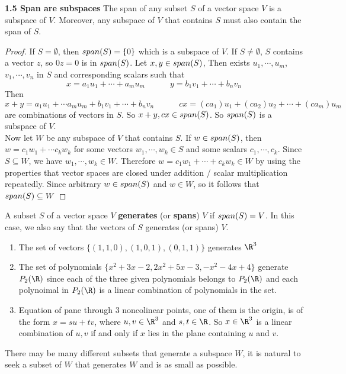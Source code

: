 \documentclass[11pt]{article}
\begin{document}
\begin{theorem*}
    \textbf{1.5 Span are subspaces} The span of any subset $S$ of a vector space $V$ is a subspace of $V$. Moreover, any subspace of $V$ that contains $S$ must also contain the span of $S$. 
    \begin{proof}
        If $S=\emptyset$, then $span(S) = \{ 0\}$ which is a subspace of $V$. If $S\neq \emptyset$, $S$ contains a vector $z$, so $0z = 0$ is in $span(S)$. Let $x,y\in span(S)$, Then exists $u_1,\cdots, u_m$, $v_1,\cdots, v_n$ in $S$ and corresponding scalars such that 
        \[
            x = a_1 u_1 + \cdots + a_m u_m 
            \quad \quad \quad 
            y = b_1 v_1 + \cdots + b_n v_n
        \]
        Then 
        \[
            x+y=a_1 u_1 + \cdots a_m u_m + b_1 v_1 + \cdots + b_n v_n 
            \quad \quad \quad 
            cx = (ca_1)u_1 + (ca_2)u_2 + \cdots + (ca_m)u_m    
        \]
        are combinations of vectors in $S$. So $x+y, cx \in span(S)$. So $span(S)$ is a subspace of $V$. \\
        Now let $W$ be any subspace of $V$ that contains $S$. If $w\in span(S)$, then $w = c_1 w_1 + \cdots c_k w_k$ for some vectors $w_1,\cdots, w_k \in S$ and some scalars $c_1, \cdots, c_k$. Since $S\subseteq W$, we have $w_1,\cdots, w_k \in W$. Therefore $w=c_1 w_1 + \cdots + c_k w_k \in W$ by using the properties that vector spaces are closed under addition / scalar multiplication repeatedly. Since arbitrary $w\in span(S)$ and $w\in W$, so it follows that $span(S)\subseteq W$ 
    \end{proof}
\end{theorem*}

\begin{defn*}
    A subset $S$ of a vector space $V$ \textbf{generates} (or \textbf{spans}) $V$ if $span(S)=V$. In this case, we also say that the vectors of $S$ generates (or spans) $V$.
    \begin{enumerate}
        \item The set of vectors $\{ (1,1,0), (1,0,1), (0,1,1)\}$ generates $\R^3$
        \item The set of polynomials $\{x^2+3x-2, 2x^2+5x-3,-x^2-4x+4 \}$ generate $P_2(\R)$ since each of the three given polynomials belongs to $P_2(\R)$ and each polynoimal in $P_2(\R)$ is a linear combination of polynomials in the set. 
        \item Equation of pane through 3 noncolinear points, one of them is the origin, is of the form $x=su+tv$, where $u,v\in\R^3$ and $s,t\in\R$. So $x\in \R^3$ is a linear combination of $u,v$ if and only if $x$ lies in the plane containing $u$ and $v$. 
    \end{enumerate}
    There may be many different subsets that generate a subspace $W$, it is natural to seek a subset of $W$ that generates $W$ and is as small as possible. 
\end{defn*}
\end{document}
